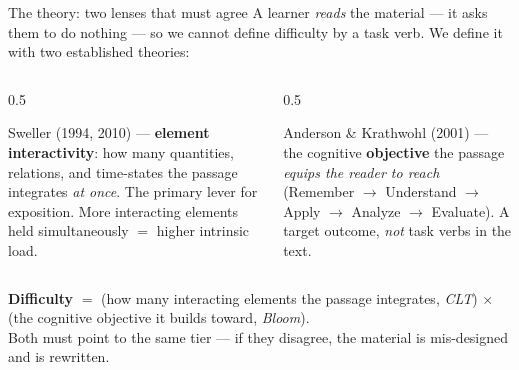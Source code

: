 \documentclass[aspectratio=169,10pt]{beamer}
\begin{document}
\begin{frame}{The theory: two lenses that must agree}
\small
A learner \emph{reads} the material --- it asks them to do nothing --- so we cannot define
difficulty by a task verb. We define it with two established theories:
\vspace{0.4em}
\begin{columns}[T]
\begin{column}{0.5\textwidth}
\begin{tcolorbox}[colback=cMeas!6,colframe=cMeas,title=\footnotesize Cognitive Load Theory,boxsep=2pt,left=3pt,right=3pt]
\scriptsize Sweller (1994, 2010) --- \textbf{element interactivity}: how many quantities,
relations, and time-states the passage integrates \emph{at once}. The primary lever for
exposition. More interacting elements held simultaneously $=$ higher intrinsic load.
\end{tcolorbox}
\end{column}
\begin{column}{0.5\textwidth}
\begin{tcolorbox}[colback=cPed!6,colframe=cPed,title=\footnotesize Bloom's Revised Taxonomy,boxsep=2pt,left=3pt,right=3pt]
\scriptsize Anderson \& Krathwohl (2001) --- the cognitive \textbf{objective} the passage
\emph{equips the reader to reach} (Remember $\rightarrow$ Understand $\rightarrow$ Apply
$\rightarrow$ Analyze $\rightarrow$ Evaluate). A target outcome, \emph{not} task verbs in the text.
\end{tcolorbox}
\end{column}
\end{columns}
\vspace{0.6em}
\begin{center}
\begin{tcolorbox}[colback=cAccent!6,colframe=cAccent,boxsep=2pt,left=5pt,right=5pt,width=0.92\textwidth]
\centering\small \textbf{Difficulty} $=$ (how many interacting elements the passage integrates,
\textit{CLT}) $\times$ (the cognitive objective it builds toward, \textit{Bloom}).\\
{\scriptsize Both must point to the same tier --- if they disagree, the material is mis-designed and is rewritten.}
\end{tcolorbox}
\end{center}
\end{frame}
\end{document}
